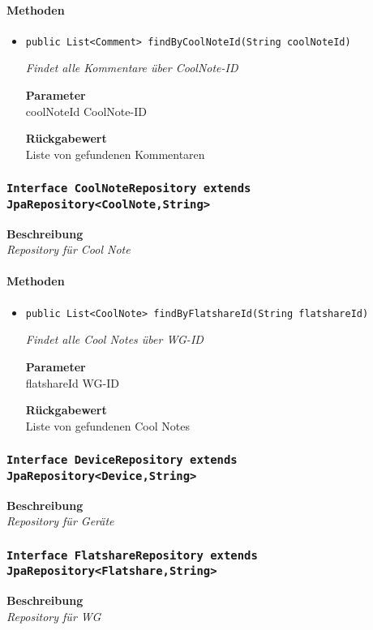      \paragraph*{Methoden}
     \begin{itemize}
     	\item{\texttt{public List<Comment> findByCoolNoteId(String coolNoteId)}}
     	
     	\textit{Findet alle Kommentare über CoolNote-ID}
     	
     	\textbf{Parameter} \\
     	coolNoteId CoolNote-ID
     	
     	\textbf{Rückgabewert} \\
     	Liste von gefundenen Kommentaren
     \end{itemize}
     \subsubsection{\texttt{Interface CoolNoteRepository extends JpaRepository<CoolNote,String>}}
     \textbf{Beschreibung} \\
     \textit{Repository für Cool Note}
     \paragraph*{Methoden}
     \begin{itemize}
     	\item{\texttt{public List<CoolNote> findByFlatshareId(String flatshareId)}}
     	
     	\textit{Findet alle Cool Notes über WG-ID}
     	
     	\textbf{Parameter} \\
     	flatshareId WG-ID
     	
     	\textbf{Rückgabewert} \\
     	Liste von gefundenen Cool Notes
     \end{itemize}
     \subsubsection{\texttt{Interface DeviceRepository extends JpaRepository<Device,String>}}
     \textbf{Beschreibung} \\
     \textit{Repository für Geräte}
     \subsubsection{\texttt{Interface FlatshareRepository extends JpaRepository<Flatshare,String>}}
     \textbf{Beschreibung} \\
     \textit{Repository für WG}

